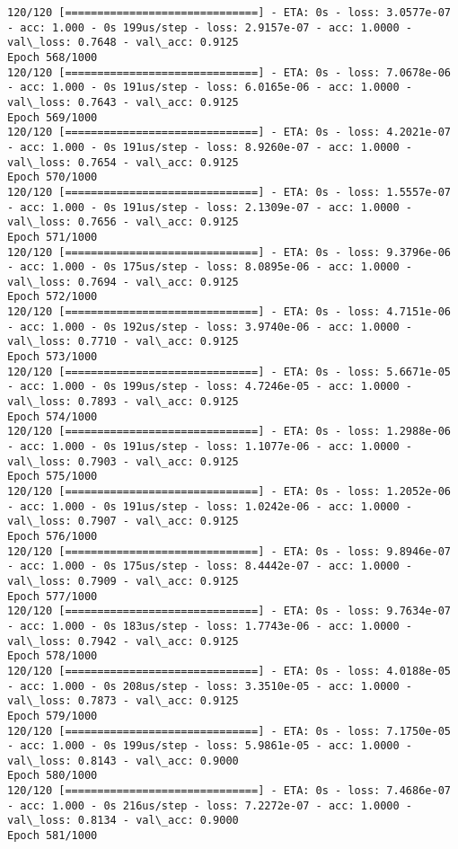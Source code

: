 \documentclass[11pt]{article}
\begin{document}
\begin{Verbatim}[commandchars=\\\{\}]
120/120 [==============================] - ETA: 0s - loss: 3.0577e-07 - acc: 1.000 - 0s 199us/step - loss: 2.9157e-07 - acc: 1.0000 - val\_loss: 0.7648 - val\_acc: 0.9125
Epoch 568/1000
120/120 [==============================] - ETA: 0s - loss: 7.0678e-06 - acc: 1.000 - 0s 191us/step - loss: 6.0165e-06 - acc: 1.0000 - val\_loss: 0.7643 - val\_acc: 0.9125
Epoch 569/1000
120/120 [==============================] - ETA: 0s - loss: 4.2021e-07 - acc: 1.000 - 0s 191us/step - loss: 8.9260e-07 - acc: 1.0000 - val\_loss: 0.7654 - val\_acc: 0.9125
Epoch 570/1000
120/120 [==============================] - ETA: 0s - loss: 1.5557e-07 - acc: 1.000 - 0s 191us/step - loss: 2.1309e-07 - acc: 1.0000 - val\_loss: 0.7656 - val\_acc: 0.9125
Epoch 571/1000
120/120 [==============================] - ETA: 0s - loss: 9.3796e-06 - acc: 1.000 - 0s 175us/step - loss: 8.0895e-06 - acc: 1.0000 - val\_loss: 0.7694 - val\_acc: 0.9125
Epoch 572/1000
120/120 [==============================] - ETA: 0s - loss: 4.7151e-06 - acc: 1.000 - 0s 192us/step - loss: 3.9740e-06 - acc: 1.0000 - val\_loss: 0.7710 - val\_acc: 0.9125
Epoch 573/1000
120/120 [==============================] - ETA: 0s - loss: 5.6671e-05 - acc: 1.000 - 0s 199us/step - loss: 4.7246e-05 - acc: 1.0000 - val\_loss: 0.7893 - val\_acc: 0.9125
Epoch 574/1000
120/120 [==============================] - ETA: 0s - loss: 1.2988e-06 - acc: 1.000 - 0s 191us/step - loss: 1.1077e-06 - acc: 1.0000 - val\_loss: 0.7903 - val\_acc: 0.9125
Epoch 575/1000
120/120 [==============================] - ETA: 0s - loss: 1.2052e-06 - acc: 1.000 - 0s 191us/step - loss: 1.0242e-06 - acc: 1.0000 - val\_loss: 0.7907 - val\_acc: 0.9125
Epoch 576/1000
120/120 [==============================] - ETA: 0s - loss: 9.8946e-07 - acc: 1.000 - 0s 175us/step - loss: 8.4442e-07 - acc: 1.0000 - val\_loss: 0.7909 - val\_acc: 0.9125
Epoch 577/1000
120/120 [==============================] - ETA: 0s - loss: 9.7634e-07 - acc: 1.000 - 0s 183us/step - loss: 1.7743e-06 - acc: 1.0000 - val\_loss: 0.7942 - val\_acc: 0.9125
Epoch 578/1000
120/120 [==============================] - ETA: 0s - loss: 4.0188e-05 - acc: 1.000 - 0s 208us/step - loss: 3.3510e-05 - acc: 1.0000 - val\_loss: 0.7873 - val\_acc: 0.9125
Epoch 579/1000
120/120 [==============================] - ETA: 0s - loss: 7.1750e-05 - acc: 1.000 - 0s 199us/step - loss: 5.9861e-05 - acc: 1.0000 - val\_loss: 0.8143 - val\_acc: 0.9000
Epoch 580/1000
120/120 [==============================] - ETA: 0s - loss: 7.4686e-07 - acc: 1.000 - 0s 216us/step - loss: 7.2272e-07 - acc: 1.0000 - val\_loss: 0.8134 - val\_acc: 0.9000
Epoch 581/1000

\end{Verbatim}
\end{document}
